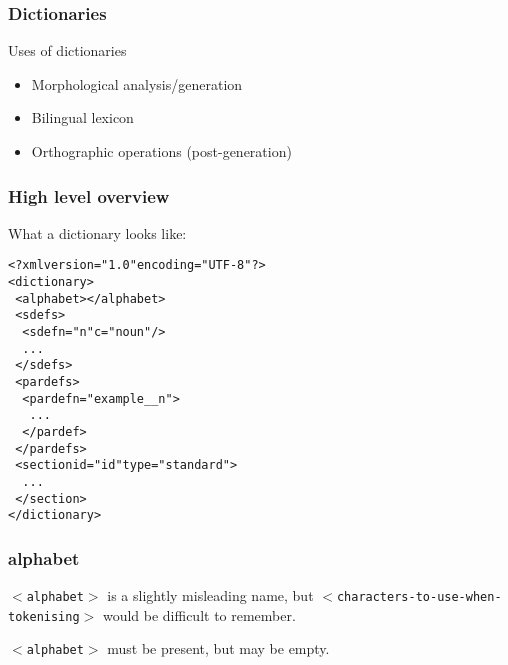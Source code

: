 \documentclass{beamer} %
\begin{document}
\begin{frame}
  \frametitle{Dictionaries}
  
  \begin{block}{Uses of dictionaries}
    \begin{itemize}
    \item Morphological analysis/generation
    \item Bilingual lexicon
    \item Orthographic operations (post-generation)
    \end{itemize}
  \end{block}

\end{frame}

\begin{frame}
  \frametitle{High level overview}

  \begin{exampleblock}{What a dictionary looks like:}
    \begin{footnotesize}
    \begin{alltt}
      <?xml version="1.0" encoding="UTF-8"?>\\
      <dictionary>\\
      ~<alphabet></alphabet>\\
      ~<sdefs>\\
      ~~<sdef n="n" c="noun"/>\\
      ~~...\\
      ~</sdefs>\\
      ~<pardefs>\\
      ~~<pardef n="example\_\_n">\\
      ~~~...\\
      ~~</pardef>\\
      ~</pardefs>\\
      ~<section id="id" type="standard">\\
      ~~...\\
      ~</section>\\
      </dictionary>\\
    \end{alltt}
    \end{footnotesize}
\end{exampleblock}

\end{frame}

\begin{frame}
  \frametitle{alphabet}

  {\tt $<$alphabet$>$} is a slightly misleading name, but
  {\tt $<$characters-to-use-when-tokenising$>$} would be 
  difficult to remember.

  {\tt $<$alphabet$>$} must be present, but may be empty.
\end{frame}
\end{document}
